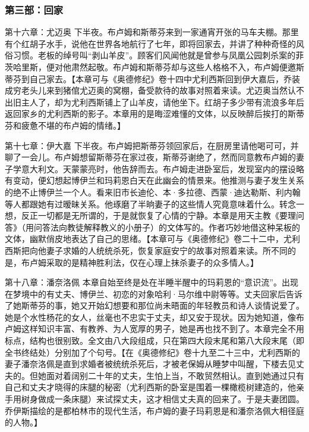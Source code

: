 \subsubsection*{第三部：回家}
\par 第十六章：尤迈奥 下半夜。布卢姆和斯蒂芬来到一家通宵开张的马车夫棚。那里有个红胡子水手，说他在世界各地航行了七年，即将回家去，并讲了种种奇怪的风俗习惯。老板的绰号叫“剥山羊皮”。顾客们风闻他就是曾参与凤凰公园刺杀案的菲茨哈里斯，便对他肃然起敬。布卢姆和斯蒂芬却与这些人格格不入，布卢姆便邀斯蒂芬到自己家去。【本章可与《奥德修纪》卷十四中尤利西斯回到伊大嘉后，乔装成穷老头儿来到猪倌尤迈奥的窝棚，备受款待的故事对照着来读。尤迈奥当然认不出旧主人了，却为尤利西斯铺上了山羊皮，请他坐下。红胡子多少带有流浪多年后返回家乡的尤利西斯的影子。本章用的是晦涩难懂的文体，以反映醉后挨打的斯蒂芬和疲惫不堪的布卢姆的情绪。】
\par 第十七章：伊大嘉 下半夜。布卢姆把斯蒂芬领回家后，在厨房里请他喝可可，并聊了一会儿。布卢姆想留斯蒂芬在家过夜，斯蒂芬谢绝了，然而同意教布卢姆的妻子学意大利文。天蒙蒙亮时，他告辞而去。布卢姆走进卧室后，发现室内的摆设略有变动，便幻想起博伊兰和玛莉恩白天在此幽会的情景来。他推测与妻子发生关系的绝不止博伊兰一个人。看来旧市长迪伦、本·多拉德、西蒙·迪达勒斯、利内翰等人都跟她有过暧昧关系。他琢磨了半晌妻子的这些情人究竟意味着什么。转念一想，反正一切都是无所谓的，于是就恢复了心情的宁静。本章是用天主教《要理问答》（用问答法向教徒解释教义的小册子）的文体写的。作者巧妙地借这种呆板的文体，幽默俏皮地表达了自己的思绪。【本章可与《奥德修纪》卷二十二中，尤利西斯把向他妻子求婚的人统统杀死，恢复家庭安宁的故事对照着来读。所不同的是，布卢姆采取的是精神胜利法，仅在心理上抹杀妻子的众多情人。】
\par 第十八章：潘奈洛佩 本章自始至终是处在半睡半醒中的玛莉恩的“意识流”。出现在梦境中的有丈夫、博伊兰、初恋的对象哈利·马尔维中尉等等。丈夫回家后告诉了她斯蒂芬的事，她又开始幻想要和那位尚未晤面的年轻教员和诗人谈情说爱了。她是个水性杨花的女人，丝毫也不忠实于丈夫，却又安于现状。因为她知道，像布卢姆这样知识丰富、有教养、为人宽厚的男子，她是再也找不到了。本章完全不用标点，结构也很别致。全文由八大段组成，只在第四大段末尾和第八大段末尾（即全书终结处）分别加了个句号。【在《奥德修纪》卷十九至二十三中，尤利西斯的妻子潘奈洛佩是直到求婚者被统统杀死后，才被老保姆从睡梦中叫醒，下楼去见丈夫的。但她面对着阔别二十年的丈夫，生怕上当，不敢贸然相认。直到她通过只有自己和丈夫才晓得的床腿的秘密（尤利西斯的卧室是围着一棵橄榄树建造的，他亲手用树身做成一条床腿）来试探丈夫，这才相信丈夫真的回来了。于是夫妻团圆。乔伊斯描绘的是都柏林市的现代生活，布卢姆的妻子玛莉恩是和潘奈洛佩大相径庭的人物。】

